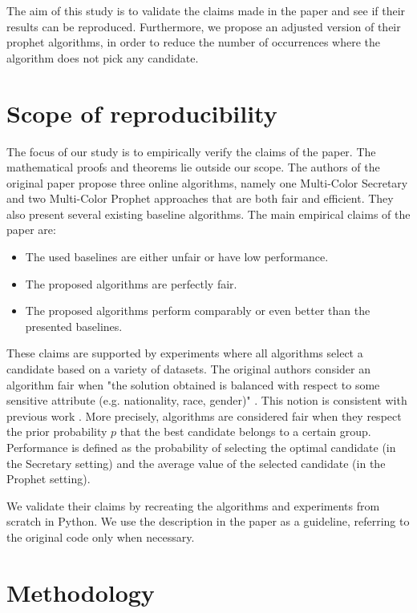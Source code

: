 The aim of this study is to validate the claims made in the paper and see if their results can be reproduced. Furthermore, we propose an adjusted version of their prophet algorithms, in order to reduce the number of occurrences where the algorithm does not pick any candidate.

\section{Scope of reproducibility}
\label{sec:claims}
The focus of our study is to empirically verify the claims of the paper. The mathematical proofs and theorems lie outside our scope. The authors of the original paper propose three online algorithms, namely one Multi-Color Secretary and two Multi-Color Prophet approaches that are both fair and efficient. They also present several existing baseline algorithms. The main empirical claims of the paper are:

\begin{itemize}
    \item The used baselines are either unfair or have low performance.
    \item The proposed algorithms are perfectly fair.
    \item The proposed algorithms perform comparably or even better than the presented baselines.
\end{itemize}

These claims are supported by experiments where all algorithms select a candidate based on a variety of datasets. The original authors consider an algorithm fair when "the solution obtained is balanced with respect to some sensitive attribute (e.g. nationality, race, gender)" \cite{correa21}. This notion is consistent with previous work \cite{ Celis_a, Chierichetti2019}. More precisely, algorithms are considered fair when they respect the prior probability $p$ that the best candidate belongs to a certain group. Performance is defined as the probability of selecting the optimal candidate (in the Secretary setting) and the average value of the selected candidate (in the Prophet setting).

We validate their claims by recreating the algorithms and experiments from scratch in Python. We use the description in the paper as a guideline, referring to the original code only when necessary.

\section{Methodology}

